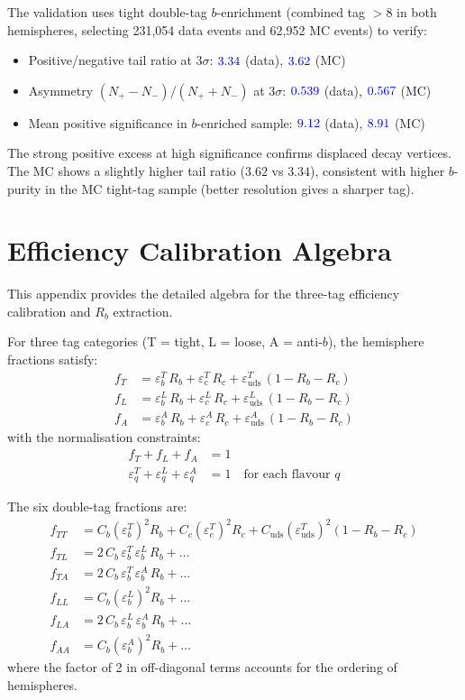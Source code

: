 \documentclass[11pt,a4paper]{article}
\newcommand{\measured}[1]{\textcolor{blue}{#1}}
\begin{document}
The validation uses tight double-tag $b$-enrichment (combined
tag $> 8$ in both hemispheres, selecting 231,054 data events and
62,952 MC events) to verify:
\begin{itemize}
\item Positive/negative tail ratio at $3\sigma$:
  $\measured{3.34}$ (data), $\measured{3.62}$ (MC)
\item Asymmetry $(N_+ - N_-)/(N_+ + N_-)$ at $3\sigma$:
  $\measured{0.539}$ (data), $\measured{0.567}$ (MC)
\item Mean positive significance in $b$-enriched sample:
  $\measured{9.12}$ (data), $\measured{8.91}$ (MC)
\end{itemize}

The strong positive excess at high significance confirms
displaced decay vertices.
The MC shows a slightly higher tail ratio ($3.62$ vs $3.34$),
consistent with higher $b$-purity in the MC tight-tag sample
(better resolution gives a sharper tag).

\section{Efficiency Calibration Algebra}
\label{app:efficiency_algebra}

This appendix provides the detailed algebra for the three-tag
efficiency calibration and $R_b$ extraction.

For three tag categories (T = tight, L = loose, A = anti-$b$),
the hemisphere fractions satisfy:
\begin{align}
f_T &= \varepsilon_b^T\,R_b + \varepsilon_c^T\,R_c +
  \varepsilon_\text{uds}^T\,(1 - R_b - R_c) \\
f_L &= \varepsilon_b^L\,R_b + \varepsilon_c^L\,R_c +
  \varepsilon_\text{uds}^L\,(1 - R_b - R_c) \\
f_A &= \varepsilon_b^A\,R_b + \varepsilon_c^A\,R_c +
  \varepsilon_\text{uds}^A\,(1 - R_b - R_c)
\end{align}
with the normalisation constraints:
\begin{align}
f_T + f_L + f_A &= 1 \\
\varepsilon_q^T + \varepsilon_q^L + \varepsilon_q^A &= 1
  \quad \text{for each flavour } q
\end{align}

The six double-tag fractions are:
\begin{align}
f_{TT} &= C_b (\varepsilon_b^T)^2 R_b +
  C_c (\varepsilon_c^T)^2 R_c +
  C_\text{uds} (\varepsilon_\text{uds}^T)^2 (1 - R_b - R_c) \\
f_{TL} &= 2\,C_b\,\varepsilon_b^T\,\varepsilon_b^L\,R_b +
  \ldots \nonumber \\
f_{TA} &= 2\,C_b\,\varepsilon_b^T\,\varepsilon_b^A\,R_b +
  \ldots \nonumber \\
f_{LL} &= C_b (\varepsilon_b^L)^2 R_b + \ldots \nonumber \\
f_{LA} &= 2\,C_b\,\varepsilon_b^L\,\varepsilon_b^A\,R_b +
  \ldots \nonumber \\
f_{AA} &= C_b (\varepsilon_b^A)^2 R_b + \ldots
\end{align}
where the factor of 2 in off-diagonal terms accounts for the
ordering of hemispheres.
\end{document}
